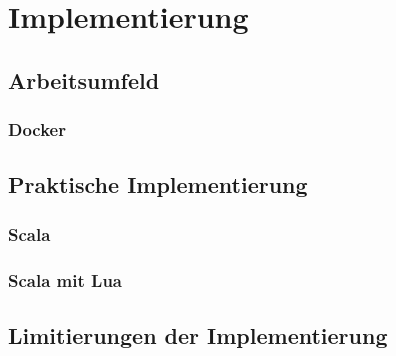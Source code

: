\chapter{Implementierung}

\section{Arbeitsumfeld}

\subsection{Docker}


\section{Praktische Implementierung}

\subsection{Scala}

\subsection{Scala mit Lua}

\section{Limitierungen der Implementierung}
